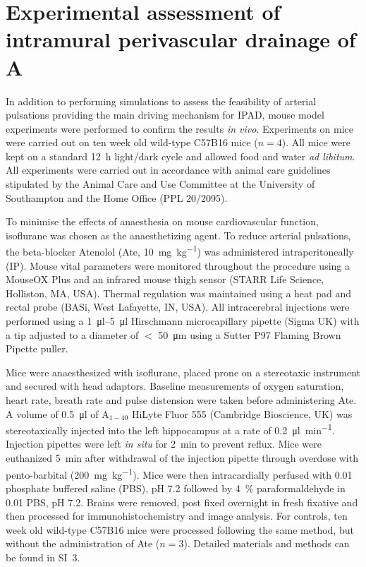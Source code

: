 \documentclass{frontiersFPHY} %
\newcommand{\Ab}{A\textbeta\xspace}
\begin{document}
\section{Experimental assessment of intramural perivascular drainage of \Ab}

In addition to performing simulations to assess the feasibility of arterial pulsations providing the main driving mechanism for IPAD, mouse model experiments were performed to confirm the results \textit{in vivo}. Experiments on mice were carried out on ten week old wild-type C57B16 mice ($n = 4$). All mice were kept on a standard \SI{12}{\hour} light/dark cycle and allowed food and water \textit{ad libitum}. All experiments were carried out in accordance with animal care guidelines stipulated by the Animal Care and Use Committee at the University of Southampton and the Home Office (PPL 20/2095).

To minimise the effects of anaesthesia on mouse cardiovascular function, isoflurane was chosen as the anaesthetizing agent. To reduce arterial pulsations, the beta-blocker Atenolol (Ate, \SI{10}{\milli\gram\per\kilo\gram}) was administered intraperitoneally (IP). Mouse vital parameters were monitored throughout the procedure using a MouseOX Plus and an infrared mouse thigh sensor (STARR Life Science, Holliston, MA, USA). Thermal regulation was maintained using a heat pad and rectal probe (BASi, West Lafayette, IN, USA). All intracerebral injections were performed using a \SIrange{1}{5}{\micro\litre} Hirschmann microcapillary pipette (Sigma UK) with a tip adjusted to a diameter of $<$ \SI{50}{\micro\metre} using a Sutter P97 Flaming Brown Pipette puller.

Mice were anaesthesized with isoflurane, placed prone on a stereotaxic instrument and secured with head adaptors. Baseline measurements of oxygen saturation, heart rate, breath rate and pulse distension were taken before administering Ate. A volume of \SI{0.5}{\micro\litre} of \Ab$_{1-40}$ HiLyte Fluor 555 (Cambridge Bioscience, UK) was stereotaxically injected into the left hippocampus at a rate of \SI{0.2}{\micro\litre\per\minute}. Injection pipettes were left \textit{in situ} for \SI{2}{\minute} to prevent reflux. Mice were euthanized \SI{5}{\minute} after withdrawal of the injection pipette through overdose with pento-barbital (\SI{200}{\milli\gram\per\kilo\gram}). Mice were then intracardially perfused with \SI{0.01}{\Molar} phosphate buffered saline (PBS), pH 7.2 followed by \SI{4}{\percent} paraformaldehyde in \SI{0.01}{\Molar} PBS, pH 7.2. Brains were removed, post fixed overnight in fresh fixative and then processed for immunohistochemistry and image analysis. For controls, ten week old wild-type C57B16 mice were processed following the same method, but without the administration of Ate ($n = 3$). Detailed materials and methods can be found in SI~3.
\end{document}
